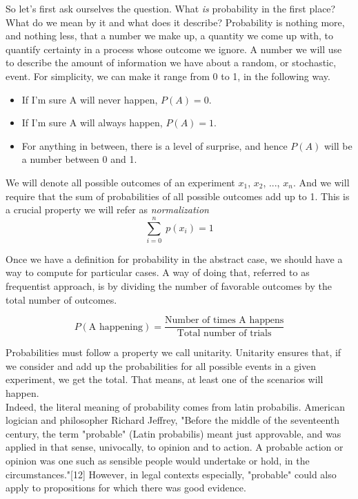 \documentclass{book}
\begin{document}
So let's first ask ourselves the question. What \textit{is} probability in the first place? What do we mean by it and what does it describe? Probability is nothing more, and nothing less, that a number we make up, a quantity we come up with, to quantify certainty in a process whose outcome we ignore. A number we will use to describe the amount of information we have about a random, or stochastic, event. For simplicity, we can make it range from 0 to 1, in the following way.

\begin{itemize}
\item If I'm sure A will never happen, $P(A) = 0$.
\item If I'm sure A will always happen,  $P(A) = 1$.
\item For anything in between, there is a level of surprise, and hence $P(A)$ will be a number between 0 and 1.
\end{itemize}

We will denote all possible outcomes of an experiment $x_{1}$, $x_{2}$, ..., $x_{n}$. And we will require that the sum of probabilities of all possible outcomes add up to 1. This is a crucial property we will refer as \textit{normalization}	
\begin{equation}
	\sum_{i = 0}^{n} \; p(x_{i}) = 1
\end{equation}

Once we have a definition for probability in the abstract case, we should have a way to compute for particular cases. A way of doing that, referred to as frequentist approach, is by dividing the number of favorable outcomes by the total number of outcomes.

\begin{equation}
	P(\text{A happening}) = \frac{\text{Number of times A happens}}{\text{Total number of trials}}
\end{equation}

Probabilities must follow a property we call unitarity. Unitarity ensures that, if we consider and add up the probabilities for all possible events in a given experiment, we get the total. That means, at least one of the scenarios will happen.\\

Indeed, the literal meaning of probability comes from latin probabilis. American logician and philosopher Richard Jeffrey, "Before the middle of the seventeenth century, the term "probable" (Latin probabilis) meant just approvable, and was applied in that sense, univocally, to opinion and to action. A probable action or opinion was one such as sensible people would undertake or hold, in the circumstances."[12] However, in legal contexts especially, "probable" could also apply to propositions for which there was good evidence.\\
\end{document}
